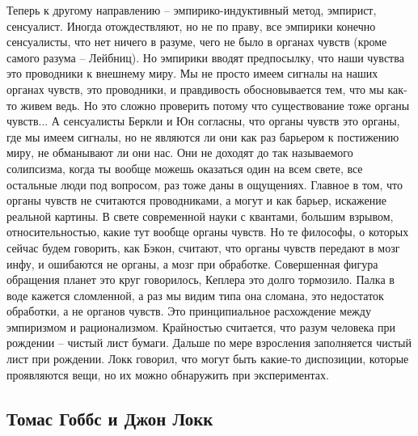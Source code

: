 \documentclass[a4paper, 12pt]{article}
\begin{document}
Теперь к другому направлению -- эмпирико-индуктивный метод, эмпирист, 
сенсуалист. Иногда отождествляют, но не по праву, все эмпирики конечно 
сенсуалисты, что нет ничего в разуме, чего не было в органах чувств 
(кроме самого разума -- Лейбниц). Но эмпирики вводят предпосылку, что 
наши чувства это проводники к внешнему миру. Мы не просто имеем сигналы 
на наших органах чувств, это проводники, и правдивость обосновывается 
тем, что мы как-то живем ведь. Но это сложно проверить потому что 
существование тоже органы чувств... А сенсуалисты Беркли и Юн согласны, 
что органы чувств это органы, где мы имеем сигналы, но не являются ли 
они как раз барьером к постижению миру, не обманывают ли они нас. Они не 
доходят до так называемого солипсизма, когда ты вообще можешь оказаться 
один на всем свете, все остальные люди под вопросом, раз тоже даны 
в ощущениях. Главное в том, что органы чувств не считаются проводниками, 
а могут и как барьер, искажение реальной картины. В свете современной 
науки с квантами, большим взрывом, относительностью, какие тут вообще 
органы чувств. Но те философы, о которых сейчас будем говорить, как 
Бэкон, считают, что органы чувств передают в мозг инфу, и ошибаются не 
органы, а мозг при обработке. Совершенная фигура обращения планет это 
круг говорилось, Кеплера это долго тормозило. Палка в воде кажется 
сломленной, а раз мы видим типа она сломана, это недостаток обработки, 
а не органов чувств. Это принципиальное расхождение между эмпиризмом 
и рационализмом. Крайностью считается, что разум человека при рождении 
-- чистый лист бумаги. Дальше по мере взросления заполняется чистый лист 
при рождении. Локк говорил, что могут быть какие-то диспозиции, которые 
проявляются вещи, но их можно обнаружить при экспериментах.

\subsection{Томас Гоббс и Джон Локк}
\end{document}
